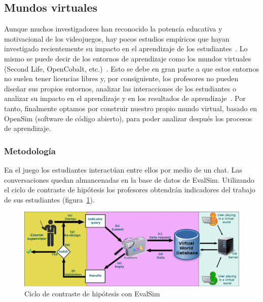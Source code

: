 \subsection{Mundos virtuales}

Aunque muchos investigadores han reconocido la potencia educativa y motivacional de los videojuegos, hay pocos estudios empíricos que hayan investigado recientemente su impacto en el aprendizaje de los estudiantes~\cite{berns2013game}. Lo mismo se puede decir de los entornos de aprendizaje como los mundos virtuales (Second Life, OpenCobalt, etc.)~\cite{hew2010use}. Esto se debe en gran parte a que estos entornos no suelen tener licencias libres y, por consiguiente, los profesores no pueden diseñar sus propios entornos, analizar las interacciones de los estudiantes o analizar su impacto en el aprendizaje y en los resultados de aprendizaje~\cite{cruz2015discovering,moreno2014serious}. Por tanto, finalmente optamos por construir nuestro propio mundo virtual, basado en OpenSim (software de código abierto), para poder analizar después los procesos de aprendizaje.

\subsubsection{Metodología}

En el juego los estudiantes interactúan entre ellos por medio de un chat. Las conversaciones quedan almancenadas en la base de datos de EvalSim. Utilizando el ciclo de contraste de hipótesis los profesores obtendrán indicadores del trabajo de sus estudiantes (figura~\ref{fig:EvalSimArchitecture}).

\begin{figure}
  \begin{center}
    \includegraphics[scale=0.29]{EvalSimArchitecture.png}
  \end{center}
  \caption{Ciclo de contraste de hipótesis con EvalSim}
  \label{fig:EvalSimArchitecture}
\end{figure}

